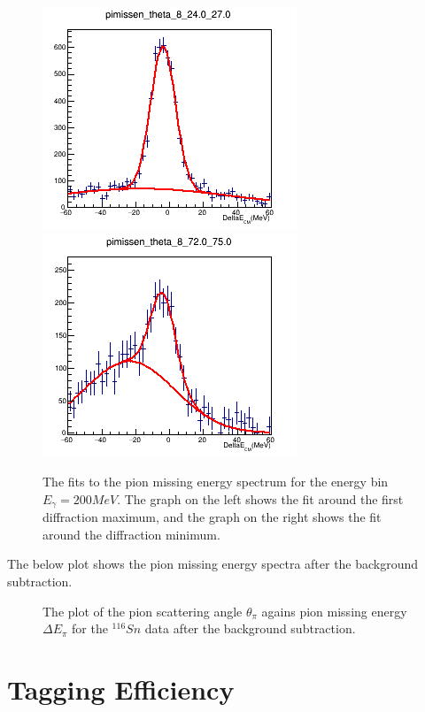 \begin{figure}[H]
\begin{center}
\includegraphics[scale=0.65]{pictures/png/fit_coherent.png}
\includegraphics[scale=0.65]{pictures/png/fit_incoherent.png}
\caption{The fits to the pion missing energy spectrum for the energy bin $E_{\gamma} = 200 MeV$. The graph on the left shows the fit around the first diffraction maximum, and the graph on the right shows the fit around the diffraction minimum.}
\end{center}
\end{figure}

\indent The below plot shows the pion missing energy spectra after the background subtraction.

\begin{figure}[H]
\begin{center}
\caption{The plot of the pion scattering angle $\theta_{\pi}$ agains pion missing energy $\Delta E_{\pi}$ for the $^{116}Sn$ data after the background subtraction.}
\label{2dbackgroundsub}
\end{center}
\end{figure}


\section{Tagging Efficiency}

